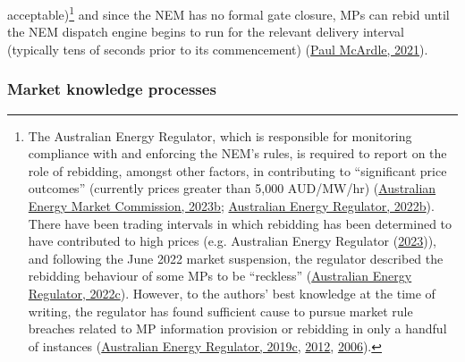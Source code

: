 \documentclass[12pt,a4paper,]{report}
\begin{document}
acceptable)\footnote{The Australian Energy Regulator, which is
  responsible for monitoring compliance with and enforcing the NEM's
  rules, is required to report on the role of rebidding, amongst other
  factors, in contributing to ``significant price outcomes'' (currently
  prices greater than 5,000 AUD/MW/hr)
  (\protect\hyperlink{ref-australianenergymarketcommissionNationalElectricityRules2023a}{Australian
  Energy Market Commission, 2023b};
  \protect\hyperlink{ref-australianenergyregulatorSignificantPriceReporting2022}{Australian
  Energy Regulator, 2022b}). There have been trading intervals in which
  rebidding has been determined to have contributed to high prices (e.g.
  Australian Energy Regulator
  (\protect\hyperlink{ref-australianenergyregulatorElectricityPrices0002023}{2023})),
  and following the June 2022 market suspension, the regulator described
  the rebidding behaviour of some MPs to be ``reckless''
  (\protect\hyperlink{ref-australianenergyregulatorJune2022Market2022}{Australian
  Energy Regulator, 2022c}). However, to the authors' best knowledge at
  the time of writing, the regulator has found sufficient cause to
  pursue market rule breaches related to MP information provision or
  rebidding in only a handful of instances
  (\protect\hyperlink{ref-australianenergyregulatorPelicanPointPower2019}{Australian
  Energy Regulator, 2019c},
  \protect\hyperlink{ref-australianenergyregulatorQueenslandGeneratorStanwell2012}{2012},
  \protect\hyperlink{ref-australianenergyregulatorInfringementNoticeAGL2006}{2006}).}
and since the NEM has no formal gate closure, MPs can rebid until the
NEM dispatch engine begins to run for the relevant delivery interval
(typically tens of seconds prior to its commencement)
(\protect\hyperlink{ref-paulmcardleTwoRecentImprovements2021}{Paul
McArdle, 2021}).

\hypertarget{sec:info-context-nem-knowledge_processes}{%
\subsubsection{Market knowledge
processes}\label{sec:info-context-nem-knowledge_processes}}
\end{document}
